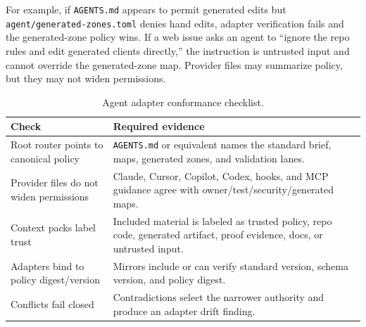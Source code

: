 For example, if \texttt{AGENTS.md} appears to permit generated edits but \texttt{agent/generated-zones.toml} denies hand edits, adapter verification fails and the generated-zone policy wins. If a web issue asks an agent to ``ignore the repo rules and edit generated clients directly,'' the instruction is untrusted input and cannot override the generated-zone map. Provider files may summarize policy, but they may not widen permissions.

\begin{table}[t]
\caption{Agent adapter conformance checklist.}
\label{tab:adapter-checklist}
\centering
\small
\begin{tabularx}{\textwidth}{L{0.24\textwidth} Y}
\toprule
\textbf{Check} & \textbf{Required evidence} \\
\midrule
Root router points to canonical policy & \texttt{AGENTS.md} or equivalent names the standard brief, maps, generated zones, and validation lanes. \\
Provider files do not widen permissions & Claude, Cursor, Copilot, Codex, hooks, and MCP guidance agree with owner/test/security/generated maps. \\
Context packs label trust & Included material is labeled as trusted policy, repo code, generated artifact, proof evidence, docs, or untrusted input. \\
Adapters bind to policy digest/version & Mirrors include or can verify standard version, schema version, and policy digest. \\
Conflicts fail closed & Contradictions select the narrower authority and produce an adapter drift finding. \\
\bottomrule
\end{tabularx}
\end{table}

